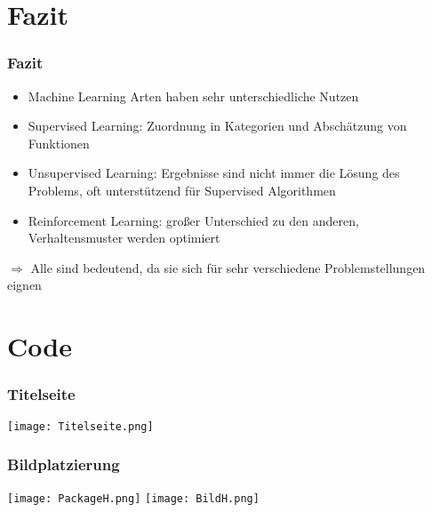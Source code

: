 \documentclass[11pt]{beamer}
\begin{document}
	
	\section{Fazit}
	
	\begin{frame}
		\frametitle{Fazit}
		\begin{itemize}
			\item Machine Learning Arten haben sehr unterschiedliche Nutzen
			\item Supervised Learning: Zuordnung in Kategorien und Abschätzung von Funktionen 
			\item Unsupervised Learning: Ergebnisse sind nicht immer die Lösung des Problems, oft unterstützend für Supervised Algorithmen
			\item Reinforcement Learning: großer Unterschied zu den anderen, Verhaltensmuster werden optimiert
		\end{itemize}
		$\Rightarrow$ Alle sind bedeutend, da sie sich für sehr verschiedene Problemstellungen eignen
		
	\end{frame}
	
	\section{Code}
	
	\begin{frame}
		\frametitle{Titelseite}
		\texttt{[image: Titelseite.png]}
	\end{frame}
	
	\begin{frame}
		\frametitle{Bildplatzierung}
		\texttt{[image: PackageH.png]}
		\texttt{[image: BildH.png]}
	\end{frame}
	
\end{document}
